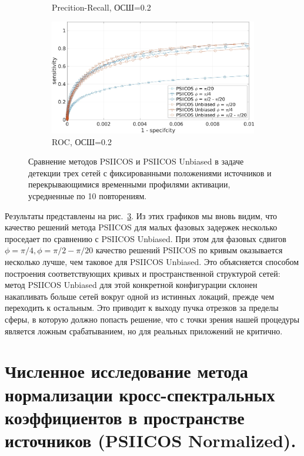 \begin{figure}[htbp]
\begin{subfigure}[t]{0.5\textwidth}
        \caption{Precition-Recall, ОСШ=0.2}\label{fig:psiicos_vs_unbiased_3_ntw_c}
    \end{subfigure}
    \begin{subfigure}[t]{0.5\textwidth}
        \includegraphics[width=0.99\linewidth]{../images/roc_3_ntw_snr_02.jpg}
        \caption{ROC, ОСШ=0.2}\label{fig:psiicos_vs_unbiased_3_ntw_d}
    \end{subfigure}
    \caption{Сравнение методов PSIICOS и PSIICOS Unbiased в задаче детекции трех сетей
        с фиксированными положениями источников и перекрывающимися временными профилями активации,
        усредненные по 10 повторениям.}\label{fig:psiicos_vs_unbiased_3_ntw}
\end{figure}

Результаты представлены на рис.~\ref{fig:psiicos_vs_unbiased_3_ntw}. Из этих графиков мы
вновь видим, что качество решений метода PSIICOS для малых фазовых задержек несколько проседает
по сравнению с PSIICOS Unbiased. При этом для фазовых сдвигов $\phi=\pi/4, \phi=\pi/2 - \pi/20$
качество решений PSIICOS по кривым оказывается несколько лучше, чем таковое для PSIICOS Unbiased.
Это объясняется способом построения соответствующих кривых и пространственной структурой сетей: метод
PSIICOS Unbiased для этой конкретной конфигурации склонен накапливать больше сетей вокруг одной из истинных
локаций, прежде чем переходить к остальным. Это приводит к выходу пучка отрезков за пределы
сферы, в которую должно попасть решение, что с точки зрения нашей процедуры является ложным срабатыванием,
но для реальных приложений не критично.

\section{Численное исследование метода нормализации кросс-спектральных коэффициентов в пространстве источников (PSIICOS Normalized).}\label{sec:psiicos_normalized_simulations}

